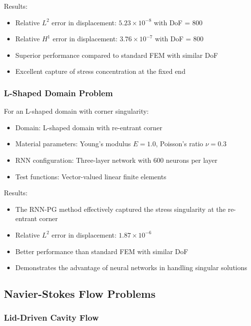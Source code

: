 \documentclass[11pt,a4paper]{article}
\begin{document}
Results:
\begin{itemize}
    \item Relative $L^2$ error in displacement: $5.23 \times 10^{-8}$ with DoF = 800
    \item Relative $H^1$ error in displacement: $3.76 \times 10^{-7}$ with DoF = 800
    \item Superior performance compared to standard FEM with similar DoF
    \item Excellent capture of stress concentration at the fixed end
\end{itemize}

\subsubsection{L-Shaped Domain Problem}

For an L-shaped domain with corner singularity:

\begin{itemize}
    \item Domain: L-shaped domain with re-entrant corner
    \item Material parameters: Young's modulus $E = 1.0$, Poisson's ratio $\nu = 0.3$
    \item RNN configuration: Three-layer network with 600 neurons per layer
    \item Test functions: Vector-valued linear finite elements
\end{itemize}

Results:
\begin{itemize}
    \item The RNN-PG method effectively captured the stress singularity at the re-entrant corner
    \item Relative $L^2$ error in displacement: $1.87 \times 10^{-6}$
    \item Better performance than standard FEM with similar DoF
    \item Demonstrates the advantage of neural networks in handling singular solutions
\end{itemize}

\subsection{Navier-Stokes Flow Problems}

\subsubsection{Lid-Driven Cavity Flow}
\end{document}
